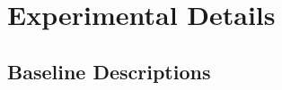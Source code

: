 \documentclass[11pt]{article}
\theoremstyle{plain}
\theoremstyle{definition}
\begin{document}







\section{Experimental Details}
\label{sec:appendix_details}

\subsection{Baseline Descriptions}
\end{document}
